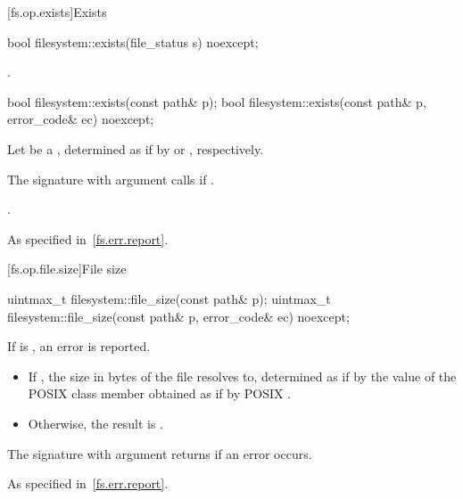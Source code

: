 [fs.op.exists]{Exists}

%
\begin{itemdecl}
bool filesystem::exists(file_status s) noexcept;
\end{itemdecl}

\begin{itemdescr}
\pnum
\returns
{}.
\end{itemdescr}

%
\begin{itemdecl}
bool filesystem::exists(const path& p);
bool filesystem::exists(const path& p, error_code& ec) noexcept;
\end{itemdecl}

\begin{itemdescr}
\pnum
Let  be a ,
determined as if by  or , respectively.

\pnum
\effects
The signature with argument  calls 
if .

\pnum
\returns
{}.

\pnum
\throws
As specified in~\ref{fs.err.report}.
\end{itemdescr}


[fs.op.file.size]{File size}

%
\begin{itemdecl}
uintmax_t filesystem::file_size(const path& p);
uintmax_t filesystem::file_size(const path& p, error_code& ec) noexcept;
\end{itemdecl}

\begin{itemdescr}
\pnum
\effects
If  is , an error is reported.

\pnum
\returns
\begin{itemize}
\item
  If , the size in bytes of the file
   resolves to, determined as if by the value of the POSIX 
  class member  obtained as if by POSIX .
\item
  Otherwise, the result is .
\end{itemize}
The signature with argument  returns 
if an error occurs.

\pnum
\throws
As specified in~\ref{fs.err.report}.
\end{itemdescr}


